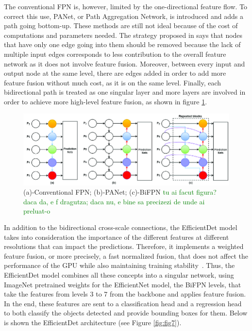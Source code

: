 The conventional FPN is, however, limited by the one-directional feature flow. To correct this use, PANet, or Path Aggregation Network, is introduced and adds a path going bottom-up. These methods are still not ideal because of the cost of computations and parameters needed. The strategy proposed in \cite{carte8} says that nodes that have only one edge going into them should be removed because the lack of multiple input edges corresponds to less contribution to the overall feature network as it does not involve feature fusion. Moreover, between every input and output node at the same level, there are edges added in order to add more feature fusion without much cost, as it is on the same level. Finally, each bidirectional path is treated as one singular layer and more layers are involved in order to achieve more high-level feature fusion, as shown in figure \ref{fig:fig6}.

\begin{figure}[!ht]
    \centering
    \includegraphics[width=1\textwidth]{figures/Figure6.png}
    \caption{(a)-Conventional FPN; (b)-PANet; (c)-BiFPN
    \textcolor{green}{tu ai facut figura? daca da, e f dragutza; daca nu, e bine sa precizezi de unde ai preluat-o}
    }
    \label{fig:fig6}
\end{figure}

In addition to the bidirectional cross-scale connections, the EfficientDet model takes into consideration the importance of the different features at different resolutions that can impact the predictions. Therefore, it implements a weighted feature fusion, or more precisely, a fast normalized fusion, that does not affect the performance of the GPU while also maintaining training stability~\cite{carte8}.
Thus, the EfficientDet model combines all these concepts into a singular network, using ImageNet pretrained weights for the EfficientNet model, the BiFPN levels, that take the features from levels 3 to 7 from the backbone and applies feature fusion. In the end, these features are sent to a classification head and a regression head to both classify the objects detected and provide bounding boxes for them. Below is shown the EfficientDet architecture (see Figure \ref{fig:fig7}).

